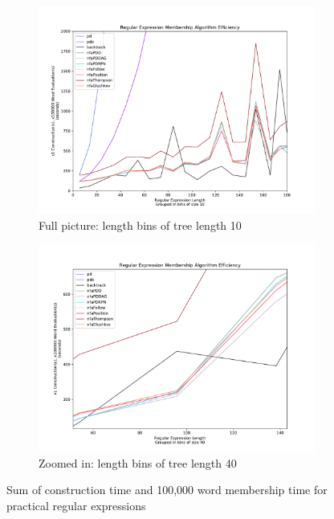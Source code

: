 \begin{figure}[H]
  \centering
  \begin{subfigure}[b]{0.45\linewidth}
    \includegraphics[width=\linewidth]{fig/prac/1const10e6eval}
    \caption{Full picture: length bins of tree length 10}
  \end{subfigure}
  \begin{subfigure}[b]{0.45\linewidth}
    \includegraphics[width=\linewidth]{fig/prac/1const10e6eval_zoomed}
    \caption{Zoomed in: length bins of tree length 40}
  \end{subfigure}
  
  \caption{Sum of construction time and 100,000 word membership time for practical regular expressions}
  \label{fig:prac/1const10e6eval}
\end{figure}





